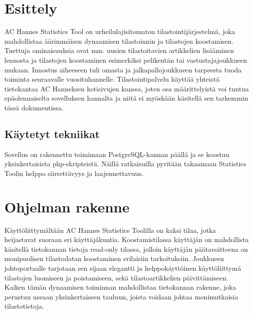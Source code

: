 \documentclass[12pt]{article} %
\begin{document}

\newpage %


\section{Esittely} %
AC Hannes Statistics Tool on urheilulajisitomaton tilastointijärjestelmä, joka mahdollistaa äärimmäisen dynaamisen tilastoinnin ja tilastojen koostamisen. Tuettuja ominaisuuksia ovat mm. uusien tilastoitavien artikkelien lisääminen lennosta ja tilastojen koostaminen esimerkiksi pelikentän tai vastustajajoukkueen mukaan. Innostus aiheeseen tuli omasta ja jalkapallojoukkueen tarpeesta tuoda toiminta seuraavalle vuosituhannelle. Tilastointipalvelu käyttää yhteistä tietokantaa AC Hanneksen kotisivujen kanssa, joten osa määrittelyistä voi tuntua epäolennaiselta sovelluksen kannalta ja niitä ei myöskään käsitellä sen tarkemmin tässä dokumentissa.

\subsection{Käytetyt tekniikat} %
Sovellus on rakennettu toimimaan PostgreSQL-kannan päällä ja se koostuu yksinkertaisista php-skripteistä. Näillä ratkaisuilla pyritään takaamaan Statistics Toolin helppo siirrettävyys ja laajennettavuus.



\section{Ohjelman rakenne} %
Käyttöliittymältään AC Hannes Statistics Toolilla on kaksi tilaa, jotka heijastavat suoraan eri käyttäjäkuntia. Koostamistilassa käyttäjän on mahdollista käsitellä tietokannan tietoja read-only tilassa, jolloin käyttäjän päätavoitteena on monipuolisen tilastodatan koostaminen erilaisiin tarkoituksiin. Joukkueen johtoportaalle tarjotaan sen sijaan elegantti ja helppokäyttöinen käyttöliittymä tilastojen luomiseen ja poistamiseen, sekä tilastoartikkelien päivittämiseen. Kaiken tämän dynaamisen toiminnan mahdollistaa tietokannan rakenne, joka perustuu useaan yksinkertaiseen tauluun, joista voidaan johtaa monimutkaisia tilastotietoja.
\end{document}
